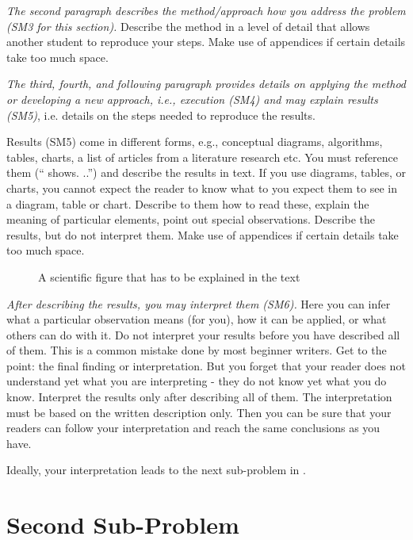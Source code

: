 \emph{The second paragraph describes the method/approach how you address the problem (SM3 for this section).}
Describe the method in a level of detail that allows another student to reproduce your steps.
Make use of appendices %
if certain details take too much space.

\emph{The third, fourth, and following paragraph provides details on applying the method or developing a new approach, i.e., execution (SM4) and may explain results (SM5)}, i.e. details on the steps needed to reproduce the results.

Results (SM5) come in different forms, e.g., conceptual diagrams, algorithms, tables, charts, a list of articles from a literature research etc. You must reference them (`` shows.
..'') and describe the results in text.
If you use diagrams, tables, or charts, you cannot expect the reader to know what to you expect them to see in a diagram, table or chart.
Describe to them how to read these, explain the meaning of particular elements, point out special observations.
Describe the results, but do not interpret them.
Make use of appendices if certain details take too much space.

\begin{figure}
  \centering
  \caption{A scientific figure that has to be explained in the text}
  \label{fig:my_label}
\end{figure}

\emph{After describing the results, you may interpret them (SM6).}
Here you can infer what a particular observation means (for you), how it can be applied, or what others can do with it.
Do not interpret your results before you have described all of them.
This is a common mistake done by most beginner writers.
Get to the point: the final finding or interpretation.
But you forget that your reader does not understand yet what you are interpreting - they do not know yet what you do know.
Interpret the results only after describing all of them.
The interpretation must be based on the written description only.
Then you can be sure that your readers can follow your interpretation and reach the same conclusions as you have.

Ideally, your interpretation leads to the next sub-problem in .

\section{Second Sub-Problem}\label{sec:problem1:subproblem2}

